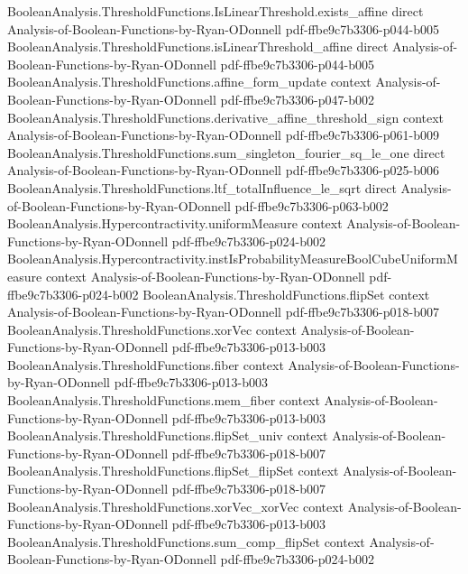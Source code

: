 \begin{theorem}
\proofstep
  {BooleanAnalysis.ThresholdFunctions.IsLinearThreshold.exists_affine}
  {direct}
  {Analysis-of-Boolean-Functions-by-Ryan-ODonnell}
  {pdf-ffbe9c7b3306-p044-b005}
\proofstep
  {BooleanAnalysis.ThresholdFunctions.isLinearThreshold_affine}
  {direct}
  {Analysis-of-Boolean-Functions-by-Ryan-ODonnell}
  {pdf-ffbe9c7b3306-p044-b005}
\proofstep
  {BooleanAnalysis.ThresholdFunctions.affine_form_update}
  {context}
  {Analysis-of-Boolean-Functions-by-Ryan-ODonnell}
  {pdf-ffbe9c7b3306-p047-b002}
\proofstep
  {BooleanAnalysis.ThresholdFunctions.derivative_affine_threshold_sign}
  {context}
  {Analysis-of-Boolean-Functions-by-Ryan-ODonnell}
  {pdf-ffbe9c7b3306-p061-b009}
\proofstep
  {BooleanAnalysis.ThresholdFunctions.sum_singleton_fourier_sq_le_one}
  {direct}
  {Analysis-of-Boolean-Functions-by-Ryan-ODonnell}
  {pdf-ffbe9c7b3306-p025-b006}
\proofstep
  {BooleanAnalysis.ThresholdFunctions.ltf_totalInfluence_le_sqrt}
  {direct}
  {Analysis-of-Boolean-Functions-by-Ryan-ODonnell}
  {pdf-ffbe9c7b3306-p063-b002}
\proofstep
  {BooleanAnalysis.Hypercontractivity.uniformMeasure}
  {context}
  {Analysis-of-Boolean-Functions-by-Ryan-ODonnell}
  {pdf-ffbe9c7b3306-p024-b002}
\proofstep
  {BooleanAnalysis.Hypercontractivity.instIsProbabilityMeasureBoolCubeUniformMeasure}
  {context}
  {Analysis-of-Boolean-Functions-by-Ryan-ODonnell}
  {pdf-ffbe9c7b3306-p024-b002}
\proofstep
  {BooleanAnalysis.ThresholdFunctions.flipSet}
  {context}
  {Analysis-of-Boolean-Functions-by-Ryan-ODonnell}
  {pdf-ffbe9c7b3306-p018-b007}
\proofstep
  {BooleanAnalysis.ThresholdFunctions.xorVec}
  {context}
  {Analysis-of-Boolean-Functions-by-Ryan-ODonnell}
  {pdf-ffbe9c7b3306-p013-b003}
\proofstep
  {BooleanAnalysis.ThresholdFunctions.fiber}
  {context}
  {Analysis-of-Boolean-Functions-by-Ryan-ODonnell}
  {pdf-ffbe9c7b3306-p013-b003}
\proofstep
  {BooleanAnalysis.ThresholdFunctions.mem_fiber}
  {context}
  {Analysis-of-Boolean-Functions-by-Ryan-ODonnell}
  {pdf-ffbe9c7b3306-p013-b003}
\proofstep
  {BooleanAnalysis.ThresholdFunctions.flipSet_univ}
  {context}
  {Analysis-of-Boolean-Functions-by-Ryan-ODonnell}
  {pdf-ffbe9c7b3306-p018-b007}
\proofstep
  {BooleanAnalysis.ThresholdFunctions.flipSet_flipSet}
  {context}
  {Analysis-of-Boolean-Functions-by-Ryan-ODonnell}
  {pdf-ffbe9c7b3306-p018-b007}
\proofstep
  {BooleanAnalysis.ThresholdFunctions.xorVec_xorVec}
  {context}
  {Analysis-of-Boolean-Functions-by-Ryan-ODonnell}
  {pdf-ffbe9c7b3306-p013-b003}
\proofstep
  {BooleanAnalysis.ThresholdFunctions.sum_comp_flipSet}
  {context}
  {Analysis-of-Boolean-Functions-by-Ryan-ODonnell}
  {pdf-ffbe9c7b3306-p024-b002}

\end{theorem}
